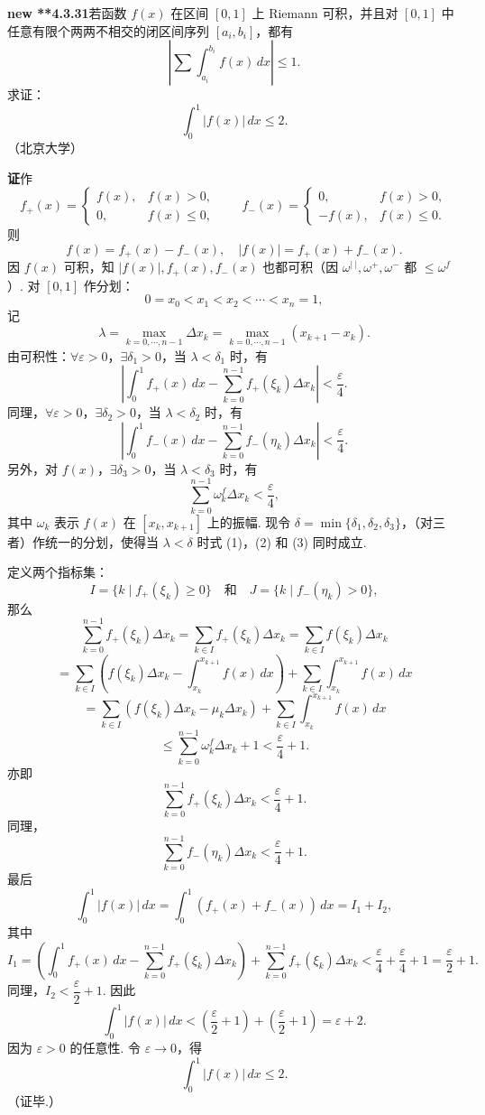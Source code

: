 \documentclass[UTF8,12pt,a4paper,fontset=fandol]{ctexart}
\begin{document}
\noindent\textbf{new **4.3.31}\quad 若函数 $f(x)$ 在区间 $[0,1]$ 上 Riemann 可积，并且对
$[0,1]$ 中任意有限个两两不相交的闭区间序列 $[a_i,b_i]$，都有
\[
\left|\sum\int_{a_i}^{b_i}f(x)\,dx\right|\le1.
\]
求证：
\[
\int_0^1|f(x)|\,dx\le2.
\]
（北京大学）

\noindent\textbf{证}\quad 作
\[
f_+(x)=
\begin{cases}
f(x),& f(x)>0,\\
0,& f(x)\le0,
\end{cases}
\qquad
f_-(x)=
\begin{cases}
0,& f(x)>0,\\
-f(x),& f(x)\le0.
\end{cases}
\]
则
\[
f(x)=f_+(x)-f_-(x),\quad |f(x)|=f_+(x)+f_-(x).
\]
因 $f(x)$ 可积，知 $|f(x)|,f_+(x),f_-(x)$ 也都可积（因
$\omega^{|\ |},\omega^+,\omega^-$ 都 $\le\omega^f$）.
对 $[0,1]$ 作分划：
\[
0=x_0<x_1<x_2<\cdots<x_n=1,
\]
记
\[
\lambda=\max_{k=0,\cdots,n-1}\Delta x_k
=\max_{k=0,\cdots,n-1}(x_{k+1}-x_k).
\]
由可积性：$\forall\varepsilon>0$，$\exists\delta_1>0$，当 $\lambda<\delta_1$ 时，有
\[
\left|\int_0^1 f_+(x)\,dx-\sum_{k=0}^{n-1}f_+(\xi_k)\Delta x_k\right|<\frac\varepsilon4. \tag{1}
\]
同理，$\forall\varepsilon>0$，$\exists\delta_2>0$，当 $\lambda<\delta_2$ 时，有
\[
\left|\int_0^1 f_-(x)\,dx-\sum_{k=0}^{n-1}f_-(\eta_k)\Delta x_k\right|<\frac\varepsilon4. \tag{2}
\]
另外，对 $f(x)$，$\exists\delta_3>0$，当 $\lambda<\delta_3$ 时，有
\[
\sum_{k=0}^{n-1}\omega_k^f\Delta x_k<\frac\varepsilon4, \tag{3}
\]
其中 $\omega_k$ 表示 $f(x)$ 在 $[x_k,x_{k+1}]$ 上的振幅. 现令
$\delta=\min\{\delta_1,\delta_2,\delta_3\}$，（对三者）作统一的分划，使得当
$\lambda<\delta$ 时式 (1)，(2) 和 (3) 同时成立.

定义两个指标集：
\[
I=\{k\mid f_+(\xi_k)\ge0\}\quad\text{和}\quad
J=\{k\mid f_-(\eta_k)>0\},
\]
那么
\[
\sum_{k=0}^{n-1}f_+(\xi_k)\Delta x_k
=\sum_{k\in I}f_+(\xi_k)\Delta x_k
=\sum_{k\in I}f(\xi_k)\Delta x_k
\]
\[
=\sum_{k\in I}\left(f(\xi_k)\Delta x_k-\int_{x_k}^{x_{k+1}}f(x)\,dx\right)
+\sum_{k\in I}\int_{x_k}^{x_{k+1}}f(x)\,dx
\]
\[
=\sum_{k\in I}(f(\xi_k)\Delta x_k-\mu_k\Delta x_k)
+\sum_{k\in I}\int_{x_k}^{x_{k+1}}f(x)\,dx
\]
\[
\le\sum_{k=0}^{n-1}\omega_k^f\Delta x_k+1
<\frac\varepsilon4+1.
\]
亦即
\[
\sum_{k=0}^{n-1}f_+(\xi_k)\Delta x_k<\frac\varepsilon4+1. \tag{4}
\]
同理，
\[
\sum_{k=0}^{n-1}f_-(\eta_k)\Delta x_k<\frac\varepsilon4+1. \tag{5}
\]
最后
\[
\int_0^1|f(x)|\,dx=\int_0^1(f_+(x)+f_-(x))\,dx=I_1+I_2,
\]
其中
\[
I_1=\left(\int_0^1f_+(x)\,dx-\sum_{k=0}^{n-1}f_+(\xi_k)\Delta x_k\right)
+\sum_{k=0}^{n-1}f_+(\xi_k)\Delta x_k
<\frac\varepsilon4+\frac\varepsilon4+1=\frac\varepsilon2+1.
\]
同理，$I_2<\dfrac\varepsilon2+1$. 因此
\[
\int_0^1|f(x)|\,dx<\left(\frac\varepsilon2+1\right)
+\left(\frac\varepsilon2+1\right)=\varepsilon+2.
\]
因为 $\varepsilon>0$ 的任意性. 令 $\varepsilon\to0$，得
\[
\int_0^1|f(x)|\,dx\le2.
\]
（证毕.）
\end{document}
